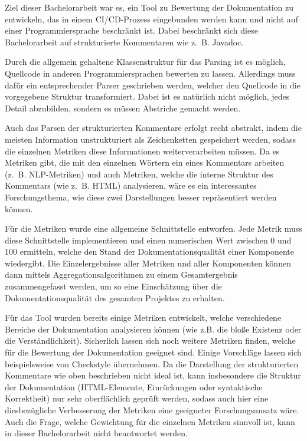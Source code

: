 Ziel dieser Bachelorarbeit war es, ein Tool zu Bewertung der Dokumentation zu entwickeln, das in einem \ac{CI/CD}-Prozess eingebunden werden kann und nicht auf einer Programmiersprache beschränkt ist. Dabei beschränkt sich diese Bachelorarbeit auf strukturierte Kommentaren wie z.~B. Javadoc. 

Durch die allgemein gehaltene Klassenstruktur für das Parsing ist es möglich, Quellcode in anderen Programmiersprachen bewerten zu lassen. Allerdings muss dafür ein entsprechender Parser geschrieben werden, welcher den Quellcode in die vorgegebene Struktur transformiert. Dabei ist es natürlich nicht möglich, jedes Detail abzubilden, sondern es müssen Abstriche gemacht werden. 

Auch das Parsen der strukturierten Kommentare erfolgt recht abstrakt, indem  die meisten Information unstrukturiert als Zeichenketten gespeichert werden, sodass die einzelnen Metriken diese Informationen weiterverarbeiten müssen. Da es Metriken gibt, die mit den einzelnen Wörtern ein eines Kommentars arbeiten (z.~B. \ac{NLP}-Metriken) und auch Metriken, welche die interne Struktur des Kommentars (wie z.~B. \ac{HTML}) analysieren, wäre es ein interessantes Forschungsthema, wie diese zwei Darstellungen besser repräsentiert werden können. 


Für die Metriken wurde eine allgemeine Schnittstelle entworfen. Jede Metrik muss diese Schnittstelle implementieren und einen numerischen Wert  zwischen 0 und 100 ermitteln, welche den Stand der Dokumentationsqualität einer Komponente wiedergibt. Die Einzelergebnisse aller Metriken und aller Komponenten können dann mittels Aggregationsalgorithmen zu einem Gesamtergebnis zusammengefasst werden, um so eine Einschätzung über die Dokumentationsqualität des gesamten Projektes zu erhalten. 

Für das Tool wurden bereits einige Metriken entwickelt, welche verschiedene Bereiche der Dokumentation analysieren können (wie z.B. die bloße Existenz oder die Verständlichkeit). Sicherlich lassen sich noch weitere Metriken finden, welche für die Bewertung der Dokumentation geeignet sind. Einige Vorschläge lassen sich beispielsweise von Checkstyle \cite{checkstyle_doc_metrics} übernehmen. Da die Darstellung der strukturierten Kommentare wie oben beschrieben nicht ideal ist, kann insbesondere die Struktur der Dokumentation (HTML-Elemente, Einrückungen oder syntaktische Korrektheit) nur sehr oberflächlich geprüft werden, sodass auch hier eine diesbezügliche Verbesserung der Metriken eine geeigneter Forschungsansatz wäre. Auch die Frage, welche Gewichtung für die einzelnen Metriken sinnvoll ist, kann in dieser Bachelorarbeit nicht beantwortet werden. 

